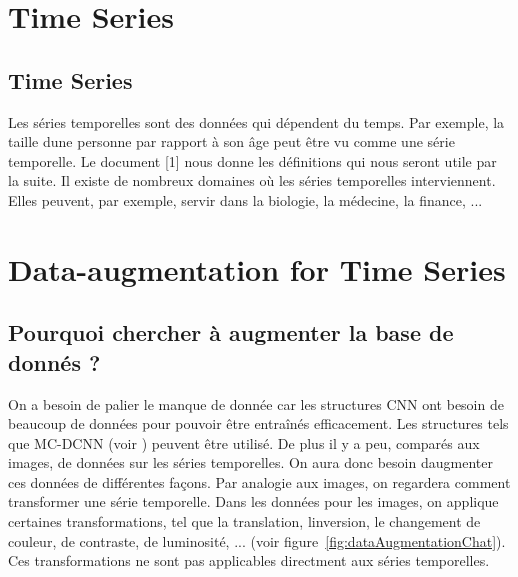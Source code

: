 \documentclass[11pt]{sdm}
\begin{document}
\section{Time Series}

	\subsection{Time Series}
		Les s\'eries temporelles sont des donn\'ees qui d\'ependent du temps. Par exemple, la taille d\textquotesingle une personne par rapport \`a son âge peut \^etre vu comme une s\'erie temporelle. Le document [1] nous donne les d\'efinitions qui nous seront utile par la suite.
		Il existe de nombreux domaines o\`u les s\'eries temporelles interviennent. Elles peuvent, par exemple, servir dans la biologie, la m\'edecine, la finance, ...



\section{Data-augmentation for Time Series}
	\subsection{Pourquoi chercher \`a augmenter la base de donn\'es ?}
		On a besoin de palier le manque de donn\'ee car les structures CNN ont besoin de beaucoup de donn\'ees pour pouvoir \^etre entra\^in\'es efficacement. Les structures tels que MC-DCNN (voir \cite{zheng2014time}) peuvent \^etre utilis\'e.
		De plus il y a peu, compar\'es aux images, de donn\'ees sur les s\'eries temporelles. On aura donc besoin d\textquotesingle augmenter ces donn\'ees de diff\'erentes fa\c cons.
		Par analogie aux images, on regardera comment transformer une s\'erie temporelle. Dans les donn\'ees pour les images, on applique certaines transformations, tel que la translation, l\textquotesingle inversion, le changement de couleur, de contraste, de luminosit\'e, ... (voir figure~\ref{fig:dataAugmentationChat}). Ces transformations ne sont pas applicables directment aux s\'eries temporelles.
\end{document}
